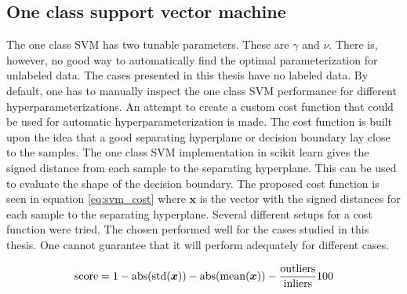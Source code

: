             \subsection{One class support vector machine}
                The one class SVM has two tunable parameters. These are $\gamma$ and $\nu$. There is, however, no good way to automatically find the optimal parameterization for unlabeled data. The cases presented in this thesis have no labeled data. By default, one has to manually inspect the one class SVM performance for different hyperparameterizations. An attempt to create a custom cost function that could be used for automatic hyperparameterization is made. The cost function is built upon the idea that a good separating hyperplane or decision boundary lay close to the samples. The one class SVM implementation in scikit learn gives the signed distance from each sample to the separating hyperplane. This can be used to evaluate the shape of the decision boundary. The proposed cost function is seen in equation \ref{eq:svm_cost} where $\bm{x}$ is the vector with the signed distances for each sample to the separating hyperplane. Several different setups for a cost function were tried. The chosen performed well for the cases studied in this thesis. One cannot guarantee that it will perform adequately for different cases.  
                
                \begin{align}
                    \operatorname{score} = 1 - \operatorname{abs}(\operatorname{std}(\bm{x})) - \operatorname{abs}(\operatorname{mean}(\bm{x})) -\frac{\operatorname{outliers}}{\operatorname{inliers}}100
                    \label{eq:svm_cost}
                \end{align}
            
